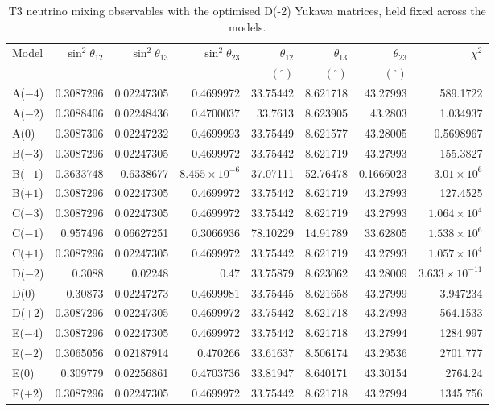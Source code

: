 \begin{table}[p]
\centering
\caption{T3 neutrino mixing observables with the optimised D(-2) Yukawa matrices, held fixed across the models.}
\label{tab:appC_Dm2_mixing}
\begingroup
\footnotesize
\setlength{\tabcolsep}{3.2pt}
\begin{tabular}{lrrrrrrr}
\hline
Model & $\sin^2\theta_{12}$ & $\sin^2\theta_{13}$ & $\sin^2\theta_{23}$ & $\theta_{12}$ & $\theta_{13}$ & $\theta_{23}$ & $\chi^2$ \\
 &  &  &  & $(^\circ)$ & $(^\circ)$ & $(^\circ)$ &  \\
\hline
A($-4$) & 0.3087296 & 0.02247305 & 0.4699972 & 33.75442 & 8.621718 & 43.27993 & 589.1722 \\
A($-2$) & 0.3088406 & 0.02248436 & 0.4700037 & 33.7613 & 8.623905 & 43.2803 & 1.034937 \\
A($0$) & 0.3087306 & 0.02247232 & 0.4699993 & 33.75449 & 8.621577 & 43.28005 & 0.5698967 \\
B($-3$) & 0.3087296 & 0.02247305 & 0.4699972 & 33.75442 & 8.621719 & 43.27993 & 155.3827 \\
B($-1$) & 0.3633748 & 0.6338677 & $8.455\times10^{-6}$ & 37.07111 & 52.76478 & 0.1666023 & $3.01\times10^{6}$ \\
B($+1$) & 0.3087296 & 0.02247305 & 0.4699972 & 33.75442 & 8.621719 & 43.27993 & 127.4525 \\
C($-3$) & 0.3087296 & 0.02247305 & 0.4699972 & 33.75442 & 8.621719 & 43.27993 & $1.064\times10^{4}$ \\
C($-1$) & 0.957496 & 0.06627251 & 0.3066936 & 78.10229 & 14.91789 & 33.62805 & $1.538\times10^{6}$ \\
C($+1$) & 0.3087296 & 0.02247305 & 0.4699972 & 33.75442 & 8.621719 & 43.27993 & $1.057\times10^{4}$ \\
D($-2$) & 0.3088 & 0.02248 & 0.47 & 33.75879 & 8.623062 & 43.28009 & $3.633\times10^{-11}$ \\
D($0$) & 0.30873 & 0.02247273 & 0.4699981 & 33.75445 & 8.621658 & 43.27999 & 3.947234 \\
D($+2$) & 0.3087296 & 0.02247305 & 0.4699972 & 33.75442 & 8.621718 & 43.27993 & 564.1533 \\
E($-4$) & 0.3087296 & 0.02247305 & 0.4699972 & 33.75442 & 8.621718 & 43.27994 & 1284.997 \\
E($-2$) & 0.3065056 & 0.02187914 & 0.470266 & 33.61637 & 8.506174 & 43.29536 & 2701.777 \\
E($0$) & 0.309779 & 0.02256861 & 0.4703736 & 33.81947 & 8.640171 & 43.30154 & 2764.24 \\
E($+2$) & 0.3087296 & 0.02247305 & 0.4699972 & 33.75442 & 8.621718 & 43.27994 & 1345.756 \\
\hline
\end{tabular}
\endgroup
\end{table}
